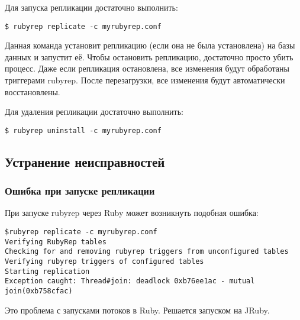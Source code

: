 Для запуска репликации достаточно выполнить:
\begin{lstlisting}[label=lst:rubyrep10,caption=Репликация]
$ rubyrep replicate -c myrubyrep.conf
\end{lstlisting}

Данная команда установит репликацию (если она не была установлена) на базы данных и запустит её. Чтобы остановить репликацию, достаточно просто убить процесс. Даже если репликация остановлена, все изменения будут обработаны триггерами rubyrep. После перезагрузки, все изменения будут автоматически восстановлены.

Для удаления репликации достаточно выполнить:

\begin{lstlisting}[label=lst:rubyrep11,caption=Репликация]
$ rubyrep uninstall -c myrubyrep.conf
\end{lstlisting}

\subsection{Устранение неисправностей}

\subsubsection{Ошибка при запуске репликации}

При запуске rubyrep через Ruby может возникнуть подобная ошибка:

\begin{lstlisting}[label=lst:rubyrep12,caption=Устранение неисправностей]
$rubyrep replicate -c myrubyrep.conf
Verifying RubyRep tables
Checking for and removing rubyrep triggers from unconfigured tables
Verifying rubyrep triggers of configured tables
Starting replication
Exception caught: Thread#join: deadlock 0xb76ee1ac - mutual join(0xb758cfac)
\end{lstlisting}

Это проблема с запусками потоков в Ruby. Решается запуском на JRuby.
